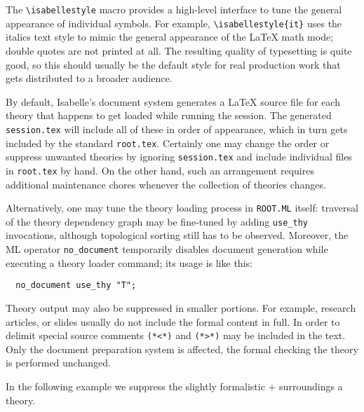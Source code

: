 \begin{isabellebody}
\begin{isamarkuptext}
  \medskip The \verb,\isabellestyle, macro provides a high-level
  interface to tune the general appearance of individual symbols.  For
  example, \verb,\isabellestyle{it}, uses the italics text style to
  mimic the general appearance of the {\LaTeX} math mode; double
  quotes are not printed at all.  The resulting quality of
  typesetting is quite good, so this should usually be the default
  style for real production work that gets distributed to a broader
  audience.%
\end{isamarkuptext}%
\isamarkuptrue%
%
\isamarkuptrue%
%
\begin{isamarkuptext}%
By default, Isabelle's document system generates a {\LaTeX} source
  file for each theory that happens to get loaded while running the
  session.  The generated \texttt{session.tex} will include all of
  these in order of appearance, which in turn gets included by the
  standard \texttt{root.tex}.  Certainly one may change the order or
  suppress unwanted theories by ignoring \texttt{session.tex} and
  include individual files in \texttt{root.tex} by hand.  On the other
  hand, such an arrangement requires additional maintenance chores
  whenever the collection of theories changes.

  Alternatively, one may tune the theory loading process in
  \texttt{ROOT.ML} itself: traversal of the theory dependency graph
  may be fine-tuned by adding \verb,use_thy, invocations, although
  topological sorting still has to be observed.  Moreover, the ML
  operator \verb,no_document, temporarily disables document generation
  while executing a theory loader command; its usage is like this:

\begin{verbatim}
  no_document use_thy "T";
\end{verbatim}

  \medskip Theory output may also be suppressed in smaller portions.
  For example, research articles, or slides usually do not include the
  formal content in full.  In order to delimit  special source comments
  \verb,(,\verb,*,\verb,<,\verb,*,\verb,), and
  \verb,(,\verb,*,\verb,>,\verb,*,\verb,), may be included in the
  text.  Only the document preparation system is affected, the formal
  checking the theory is performed unchanged.

  In the following example we suppress the slightly formalistic
   +  surroundings a theory.


\end{isamarkuptext}
\end{isabellebody}

